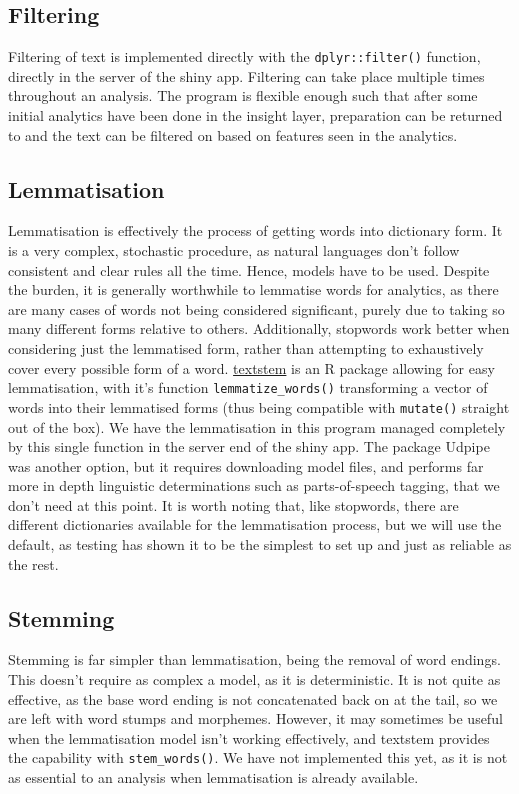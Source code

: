 \documentclass[11pt, a4paper, oneside]{report}
\begin{document}
\subsection{Filtering}
\label{sec:orge4eec20}
Filtering of text is implemented directly with the
\texttt{dplyr::filter()} function, directly in the server of
the shiny app. Filtering can take place multiple times throughout an
analysis. The program is flexible enough such that after some initial
analytics have been done in the insight layer, preparation can be
returned to and the text can be filtered on based on features seen in
the analytics.
\subsection{Lemmatisation}
\label{sec:org33549e9}
Lemmatisation is effectively the process of getting words into
dictionary form. It is a very complex, stochastic procedure, as
natural languages don't follow consistent and clear rules all the
time. Hence, models have to be used. Despite the burden, it is
generally worthwhile to lemmatise words for analytics, as there are
many cases of words not being considered significant, purely due to
taking so many different forms relative to others. Additionally,
stopwords work better when considering just the lemmatised form,
rather than attempting to exhaustively cover every possible form of a
word. \href{https://github.com/trinker/textstem/}{textstem} is an R
package allowing for easy lemmatisation, with it's function
\texttt{lemmatize_words()} transforming a vector of words into their
lemmatised forms (thus being compatible with \texttt{mutate()} straight
out of the box). We have the lemmatisation in this program managed
completely by this single function in the server end of the shiny app.
The package Udpipe was another option, but it requires downloading
model files, and performs far more in depth linguistic determinations
such as parts-of-speech tagging, that we don't need at this point.
It is worth noting that, like stopwords, there are different dictionaries
available for the lemmatisation process, but we will use the default,
as testing has shown it to be the simplest to set up and just as
reliable as the rest.
\subsection{Stemming}
\label{sec:orgca6bac4}
Stemming is far simpler than lemmatisation, being the removal of word
endings. This doesn't require as complex a model, as it is
deterministic. It is not quite as effective, as the base word ending
is not concatenated back on at the tail, so we are left with word
stumps and morphemes. However, it may sometimes be useful when the
lemmatisation model isn't working effectively, and textstem provides
the capability with \texttt{stem_words()}. We have not
implemented this yet, as it is not as essential to an analysis when
lemmatisation is already available.
\end{document}
